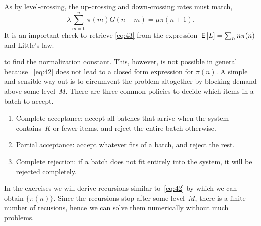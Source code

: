\documentclass[queueing-book.tex]{subfiles}
\begin{document}
As by level-crossing, the up-crossing and down-crossing rates must match,
\begin{equation}\label{eq:42}
\lambda \sum_{m=0}^n \pi(m) G(n-m) = \mu \pi(n+1).
\end{equation}
It is an important check to retrieve \cref{eq:43} from the expression $\,\mathsf{E}\left[L\right] = \sum_{n} n \pi(n)$ and Little's law.

 to find the normalization constant.
This, however, is not possible in general because ~\cref{eq:42} does not lead to a closed form expression for $\pi(n)$.
A simple and sensible way out is to circumvent the problem altogether by blocking demand above some level~$M$.
There are three common policies to decide which items in a batch to accept.
\begin{enumerate}
\item Complete acceptance: accept all batches that arrive when the system contains~$K$ or fewer items, and reject the entire batch otherwise.
\item Partial acceptance: accept whatever fits of a batch, and reject the rest.
\item Complete rejection: if a batch does not fit entirely into the system, it will be rejected completely.
\end{enumerate}
In the exercises we will derive recursions similar to~\cref{eq:42} by which we can obtain $\{\pi(n)\}$.
Since the recursions stop after some level~$M$, there is a finite number of recusions, hence we can solve them numerically without much problems.
\end{document}
